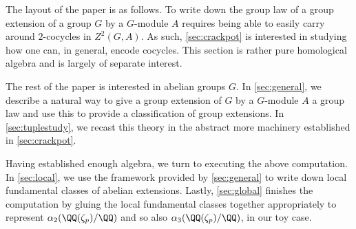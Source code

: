 The layout of the paper is as follows. To write down the group law of a group extension of a group $G$ by a $G$-module $A$ requires being able to easily carry around $2$-cocycles in $Z^2(G,A)$. As such, \autoref{sec:crackpot} is interested in studying how one can, in general, encode cocycles. This section is rather pure homological algebra and is largely of separate interest.

The rest of the paper is interested in abelian groups $G$. In \autoref{sec:general}, we describe a natural way to give a group extension of $G$ by a $G$-module $A$ a group law and use this to provide a classification of group extensions. In \autoref{sec:tuplestudy}, we recast this theory in the abstract more machinery established in \autoref{sec:crackpot}.

Having established enough algebra, we turn to executing the above computation. In \autoref{sec:local}, we use the framework provided by \autoref{sec:general} to write down local fundamental classes of abelian extensions. Lastly, \autoref{sec:global} finishes the computation by gluing the local fundamental classes together appropriately to represent $\alpha_2(\QQ(\zeta_p)/\QQ)$ and so also $\alpha_3(\QQ(\zeta_p)/\QQ)$, in our toy case.